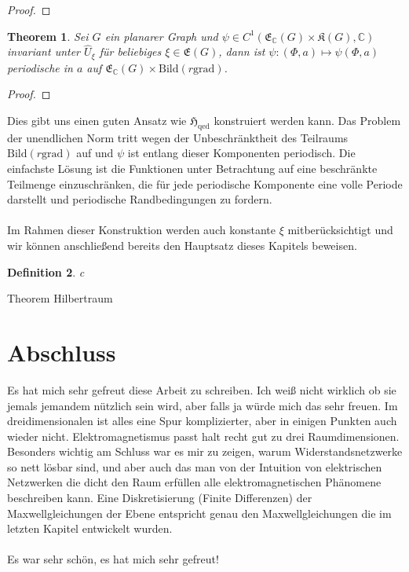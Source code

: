 \documentclass[11pt,a4paper,leqno]{report}
\newtheorem{theorem}{Theorem}[chapter]
\newtheorem{definition}[theorem]{Definition}
\numberwithin{equation}{chapter}
\begin{document}
\begin{proof}
\end{proof}
\noindent
\begin{theorem}
	Sei $G$ ein planarer Graph und $\psi\in C^1(\mathfrak{E}_\mathbb{C}(G)\times\mathfrak{K}(G), \mathbb{C})$ invariant unter $\hat{U}_\xi$ f\"ur beliebiges $\xi\in\mathfrak{E}(G)$, dann ist $\psi:(\Phi,a)\mapsto\psi(\Phi, a)$ periodische in $a$ auf $\mathfrak{E}_\mathbb{C}(G)\times\text{Bild}(r\text{grad})$.
\end{theorem}
\begin{proof}
	
\end{proof}
\noindent
Dies gibt uns einen guten Ansatz wie $\mathfrak{H}_{\text{qed}}$ konstruiert werden kann. Das Problem der unendlichen Norm tritt wegen der Unbeschränktheit des Teilraums $\text{Bild}(r\text{grad})$ auf und $\psi$ ist entlang dieser Komponenten periodisch. Die einfachste L\"osung ist die Funktionen unter Betrachtung auf eine beschränkte Teilmenge einzuschränken, die f\"ur jede periodische Komponente eine volle Periode darstellt und periodische Randbedingungen zu fordern.\\
\\
Im Rahmen dieser Konstruktion werden auch konstante $\xi$ mitber\"ucksichtigt und wir k\"onnen anschlie\ss{}end bereits den Hauptsatz dieses Kapitels beweisen.
\begin{definition}
	c
	$$$$
	$$$$
	$$$$
	$$$$
\end{definition}

Theorem Hilbertraum





















\chapter*{Abschluss}
Es hat mich sehr gefreut diese Arbeit zu schreiben. Ich wei\ss{} nicht wirklich ob sie jemals jemandem n\"utzlich sein wird, aber falls ja w\"urde mich das sehr freuen. Im dreidimensionalen ist alles eine Spur komplizierter, aber in einigen Punkten auch wieder nicht. Elektromagnetismus passt halt recht gut zu drei Raumdimensionen. Besonders wichtig am Schluss war es mir zu zeigen, warum Widerstandsnetzwerke so nett l\"osbar sind, und aber auch das man von der Intuition von elektrischen Netzwerken die dicht den Raum erf\"ullen alle elektromagnetischen Ph\"anomene beschreiben kann. Eine Diskretisierung (Finite Differenzen) der Maxwellgleichungen der Ebene entspricht genau den Maxwellgleichungen die im letzten Kapitel entwickelt wurden. \\
\\
Es war sehr sch\"on, es hat mich sehr gefreut!
\end{document}
